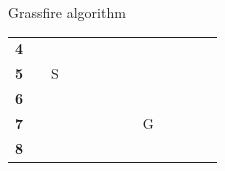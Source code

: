 \documentclass[compress,xcolor=table]{beamer}
\begin{document}
\begin{frame}{Grassfire algorithm}
\begin{center}
{\begin{tabular}{rcccccccccccc}
                \multicolumn{1}{r|}{\textbf{4}}  & \multicolumn{1}{c|}{}          & \multicolumn{1}{c|}{}                          & \multicolumn{1}{c|}{}                         & \multicolumn{1}{c|}{}                         & \multicolumn{1}{c|}{}                         & \multicolumn{1}{c|}{}          & \multicolumn{1}{c|}{}          & \multicolumn{1}{c|}{}                          & \multicolumn{1}{c|}{}                         & \multicolumn{1}{c|}{}                         & \multicolumn{1}{c|}{}                         & \multicolumn{1}{c|}{}          \\ \cline{2-13} 
                \multicolumn{1}{r|}{\textbf{5}}  & \multicolumn{1}{c|}{}          & \multicolumn{1}{c|}{\cellcolor[HTML]{63AC4B}S} & \multicolumn{1}{c|}{}                         & \multicolumn{1}{c|}{\cellcolor[HTML]{000000}} & \multicolumn{1}{c|}{\cellcolor[HTML]{000000}} & \multicolumn{1}{c|}{}          & \multicolumn{1}{c|}{}          & \multicolumn{1}{c|}{}                          & \multicolumn{1}{c|}{}                         & \multicolumn{1}{c|}{}                         & \multicolumn{1}{c|}{}                         & \multicolumn{1}{c|}{}          \\ \cline{2-13} 
                \multicolumn{1}{r|}{\textbf{6}}  & \multicolumn{1}{c|}{}          & \multicolumn{1}{c|}{}                          & \multicolumn{1}{c|}{}                         & \multicolumn{1}{c|}{}                         & \multicolumn{1}{c|}{\cellcolor[HTML]{000000}} & \multicolumn{1}{c|}{}          & \multicolumn{1}{c|}{}          & \multicolumn{1}{c|}{}                          & \multicolumn{1}{c|}{}                         & \multicolumn{1}{c|}{\cellcolor[HTML]{000000}} & \multicolumn{1}{c|}{}                         & \multicolumn{1}{c|}{}          \\ \cline{2-13} 
                \multicolumn{1}{r|}{\textbf{7}}  & \multicolumn{1}{c|}{}          & \multicolumn{1}{c|}{}                          & \multicolumn{1}{c|}{}                         & \multicolumn{1}{c|}{}                         & \multicolumn{1}{c|}{\cellcolor[HTML]{000000}} & \multicolumn{1}{c|}{}          & \multicolumn{1}{c|}{}          & \multicolumn{1}{c|}{\cellcolor[HTML]{CA4444}G} & \multicolumn{1}{c|}{}                         & \multicolumn{1}{c|}{\cellcolor[HTML]{000000}} & \multicolumn{1}{c|}{}                         & \multicolumn{1}{c|}{}          \\ \cline{2-13} 
                \multicolumn{1}{r|}{\textbf{8}}  & \multicolumn{1}{c|}{}          & \multicolumn{1}{c|}{}                          & \multicolumn{1}{c|}{\cellcolor[HTML]{000000}} & \multicolumn{1}{c|}{\cellcolor[HTML]{000000}} & \multicolumn{1}{c|}{\cellcolor[HTML]{000000}} & \multicolumn{1}{c|}{}          & \multicolumn{1}{c|}{}          & \multicolumn{1}{c|}{}                          & \multicolumn{1}{c|}{}                         & \multicolumn{1}{c|}{\cellcolor[HTML]{000000}} & \multicolumn{1}{c|}{}                         & \multicolumn{1}{c|}{}          \\ \cline{2-13} 

\end{tabular}}
\end{center}
\end{frame}
\end{document}
